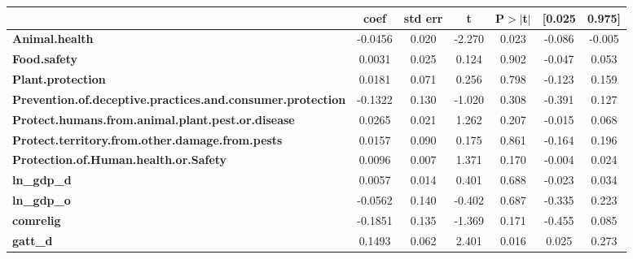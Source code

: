 \begin{center}
\begin{tabular}{lcccccc}
                                                                   & \textbf{coef} & \textbf{std err} & \textbf{t} & \textbf{P$> |$t$|$} & \textbf{[0.025} & \textbf{0.975]}  \\
\midrule
\textbf{Animal.health}                                             &      -0.0456  &        0.020     &    -2.270  &         0.023        &       -0.086    &       -0.005     \\
\textbf{Food.safety}                                               &       0.0031  &        0.025     &     0.124  &         0.902        &       -0.047    &        0.053     \\
\textbf{Plant.protection}                                          &       0.0181  &        0.071     &     0.256  &         0.798        &       -0.123    &        0.159     \\
\textbf{Prevention.of.deceptive.practices.and.consumer.protection} &      -0.1322  &        0.130     &    -1.020  &         0.308        &       -0.391    &        0.127     \\
\textbf{Protect.humans.from.animal.plant.pest.or.disease}          &       0.0265  &        0.021     &     1.262  &         0.207        &       -0.015    &        0.068     \\
\textbf{Protect.territory.from.other.damage.from.pests}            &       0.0157  &        0.090     &     0.175  &         0.861        &       -0.164    &        0.196     \\
\textbf{Protection.of.Human.health.or.Safety}                      &       0.0096  &        0.007     &     1.371  &         0.170        &       -0.004    &        0.024     \\
\textbf{ln\_gdp\_d}                                                &       0.0057  &        0.014     &     0.401  &         0.688        &       -0.023    &        0.034     \\
\textbf{ln\_gdp\_o}                                                &      -0.0562  &        0.140     &    -0.402  &         0.687        &       -0.335    &        0.223     \\
\textbf{comrelig}                                                  &      -0.1851  &        0.135     &    -1.369  &         0.171        &       -0.455    &        0.085     \\
\textbf{gatt\_d}                                                   &       0.1493  &        0.062     &     2.401  &         0.016        &        0.025    &        0.273     \\

\end{tabular}
\end{center}
